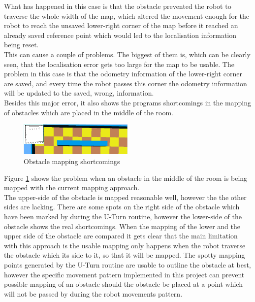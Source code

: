 What has happened in this case is that the obstacle prevented the robot to traverse the whole width of the map, which altered the movement enough for the robot to reach the unsaved lower-right corner of the map before it reached an already saved reference point which would led to the localisation information being reset. \\
This can cause a couple of problems. The biggest of them is, which can be clearly seen, that the localisation error gets too large for the map to be usable. The problem in this case is that the odometry information of the lower-right corner are saved, and every time the robot passes this corner the odometry information will be updated to the saved, wrong, information.\\[3ex]

Besides this major error, it also shows the programs shortcomings in the mapping of obstacles which are placed in the middle of the room. 

\begin{figure}[h]
\centering
\includegraphics[width = 0.5\textwidth]{../../figures/map_results/obstacle_mapping_error.png}
\caption{Obstacle mapping shortcomings}
\label{obstacle_mapping_error}
\end{figure}

Figure \ref{obstacle_mapping_error} shows the problem when an obstacle in the middle of the room is being mapped with the current mapping approach. \\
The upper-side of the obstacle is mapped reasonable well, however the the other sides are lacking. There are some spots on the right side of the obstacle which have been marked by during the U-Turn routine, however the lower-side of the obstacle shows the real shortcomings. When the mapping of the lower and the upper side of the obstacle are compared it gets clear that the main limitation with this approach is the usable mapping only happens when the robot traverse the obstacle which its side to it, so that it will be mapped. The spotty mapping points generated by the U-Turn routine are usable to outline the obstacle at best, however the specific movement pattern implemented in this project can prevent possible mapping of an obstacle should the obstacle be placed at a point which will not be passed by during the robot movements pattern. \\[3ex]

